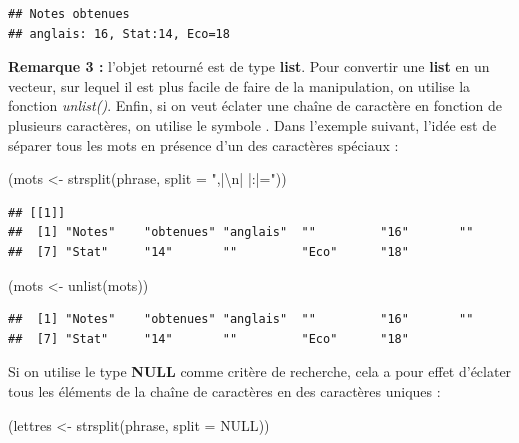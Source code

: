 \documentclass[
]{book}
\newenvironment{Shaded}{\begin{snugshade}}{\end{snugshade}}
\newcommand{\AttributeTok}[1]{\textcolor[rgb]{0.77,0.63,0.00}{#1}}
\newcommand{\ConstantTok}[1]{\textcolor[rgb]{0.00,0.00,0.00}{#1}}
\newcommand{\FunctionTok}[1]{\textcolor[rgb]{0.00,0.00,0.00}{#1}}
\newcommand{\NormalTok}[1]{#1}
\newcommand{\OtherTok}[1]{\textcolor[rgb]{0.56,0.35,0.01}{#1}}
\newcommand{\SpecialCharTok}[1]{\textcolor[rgb]{0.00,0.00,0.00}{#1}}
\newcommand{\StringTok}[1]{\textcolor[rgb]{0.31,0.60,0.02}{#1}}
\theoremstyle{definition}
\theoremstyle{definition}
\theoremstyle{definition}
\theoremstyle{definition}
\theoremstyle{remark}
\begin{document}
\begin{verbatim}
## Notes obtenues
## anglais: 16, Stat:14, Eco=18
\end{verbatim}

\textbf{Remarque 3 :} l'objet retourné est de type \textbf{list}. Pour convertir une \textbf{list} en un vecteur, sur lequel il est plus facile de faire de la manipulation, on utilise la fonction \emph{unlist()}. Enfin, si on veut éclater une chaîne de caractère en fonction de plusieurs caractères, on utilise le symbole \textbar. Dans l'exemple suivant, l'idée est de séparer tous les mots en présence d'un des caractères spéciaux :

\begin{Shaded}
\begin{Highlighting}[]
\NormalTok{(mots }\OtherTok{\textless{}{-}} \FunctionTok{strsplit}\NormalTok{(phrase, }\AttributeTok{split =} \StringTok{",|}\SpecialCharTok{\textbackslash{}n}\StringTok{| |:|="}\NormalTok{))}
\end{Highlighting}
\end{Shaded}

\begin{verbatim}
## [[1]]
##  [1] "Notes"    "obtenues" "anglais"  ""         "16"       ""        
##  [7] "Stat"     "14"       ""         "Eco"      "18"
\end{verbatim}

\begin{Shaded}
\begin{Highlighting}[]
\NormalTok{(mots }\OtherTok{\textless{}{-}} \FunctionTok{unlist}\NormalTok{(mots))}
\end{Highlighting}
\end{Shaded}

\begin{verbatim}
##  [1] "Notes"    "obtenues" "anglais"  ""         "16"       ""        
##  [7] "Stat"     "14"       ""         "Eco"      "18"
\end{verbatim}

Si on utilise le type \textbf{NULL} comme critère de recherche, cela a pour effet d'éclater tous les éléments de la chaîne de caractères en des caractères uniques :

\begin{Shaded}
\begin{Highlighting}[]
\NormalTok{(lettres }\OtherTok{\textless{}{-}} \FunctionTok{strsplit}\NormalTok{(phrase, }\AttributeTok{split =} \ConstantTok{NULL}\NormalTok{))}
\end{Highlighting}
\end{Shaded}
\end{document}
